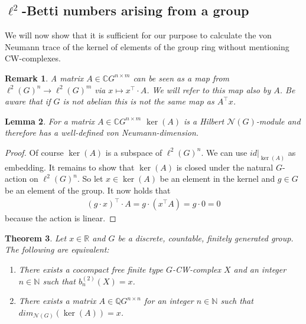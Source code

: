 \documentclass[12pt,a4paper]{scrartcl}
\newtheorem{Theorem}{Theorem}[section]
\newtheorem{Lemma}[Theorem]{Lemma}
\newtheorem{Remark}[Theorem]{Remark}
\numberwithin{equation}{section}
\newcommand{\C}{\mathbb{C}} %
\newcommand{\R}{\mathbb{R}} %
\newcommand{\Q}{\mathbb{Q}} %
\newcommand{\N}{\mathbb{N}} %
\newcommand{\2}{\mathbb{Z} / 2 \mathbb{Z}}
\newcommand{\1}{\bar{1}}
\newcommand{\0}{\bar{0}}
\begin{document}
\subsection{$\ell^2$-Betti numbers arising from a group}
We will now show that it is sufficient for our purpose to calculate the von Neumann trace of the kernel of elements of the group ring without mentioning CW-complexes.
\begin{Remark}\label{MAB}
	A matrix $A \in \C G^{n \times m}$ can be seen as a map from $\ell^2(G)^n \to \ell^2(G)^m$ via $x \mapsto x^{\top} \cdot A$. We will refer to this map also by $A$. Be aware that if $G$ is not abelian this is not the same map as $A^\top x$.
\end{Remark}
\begin{Lemma}
	For a matrix $A \in \C G^{n \times m}$ $\ker(A)$ is a Hilbert $\mathcal{N}(G)$-module and therefore has a well-defined von Neumann-dimension.
\end{Lemma}
\begin{proof}
	Of course $\ker(A)$ is a subspace of $\ell^2 (G)^n$. We can use $id|_{\ker(A)}$ as embedding. It remains to show that $\ker(A)$ is closed under the natural $G$-action on $\ell^2 (G)^n$. So let $x \in \ker(A)$ be an element in the kernel and $g \in G$ be an element of the group. It now holds that
	\begin{align*}
		(g \cdot x)^\top \cdot A = g \cdot (x^\top A) = g \cdot 0 = 0
	\end{align*}
	because the action is linear.
\end{proof}
\begin{Theorem} \label{MCW}
	Let $x \in \R$ and $G$ be a discrete, countable, finitely generated group. The following are equivalent:
	\begin{enumerate}
		\item There exists a cocompact free finite type $G$-CW-complex $X$ and an integer $n \in \N$ such that $b_n^{(2)}(X)=x$.
		\item There exists a matrix $A \in \Q G^{n \times n}$ for an integer $n \in \N$ such that \newline $dim_{\mathcal{N}(G)}(\ker (A))=x$.
	\end{enumerate}
\end{Theorem}
\end{document}
